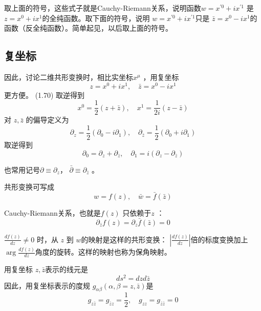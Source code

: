 取上面的符号，这些式子就是Cauchy-Riemann关系，说明函数$ w=x^{\prime 0}+i x^{\prime 1}$ 是 $z=x^{0}+i x^{1} $的全纯函数。取下面的符号，说明 $w=x^{\prime 0}+i x^{\prime 1} $只是 $\bar{z}=x^{0}-i x^{1} $的函数（反全纯函数）。简单起见，以后取上面的符号。

\subsection{复坐标}

因此，讨论二维共形变换时，相比实坐标$ x^\mu$ ，用复坐标
\begin{equation}
	z=x^{0}+i x^{1}, \quad \bar{z}=x^{0}-i x^{1}
\end{equation}
更方便。 (1.70) 取逆得到
\begin{equation}
	x^{0}=\frac{1}{2}(z+\bar{z}), \quad x^{1}=\frac{1}{2 i}(z-\bar{z})
\end{equation}
对 $z,\bar{z}$ 的偏导定义为
\begin{equation}
	\partial_{z}=\frac{1}{2}\left(\partial_{0}-i \partial_{1}\right), \quad \partial_{\bar{z}}=\frac{1}{2 }\left(\partial_{0}+i \partial_{1}\right)
\end{equation}
取逆得到
\begin{equation}
	\partial_{0}=\partial_{z}+\partial_{\bar{z}}, \quad \partial_{1}=i\left(\partial_{z}-\partial_{\bar{z}}\right)
\end{equation}

也常用记号$ \partial\equiv\partial_z $， $\bar{\partial}\equiv\partial_{\bar{z}}$ 。

共形变换可写成
\begin{equation}
	w=f(z), \quad \bar{w}=\bar{f}(\bar{z})
\end{equation}

Cauchy-Riemann关系，也就是$ f(z)$ 只依赖于$ z$ ：
\begin{equation}
	\partial_{\bar{z}} f(z)=\partial_{z} \bar{f}(\bar{z})=0
\end{equation}

$\frac{d f(z)}{d z} \neq 0$ 时，从 $z$ 到 $w $的映射是这样的共形变换： $\left|\frac{d f(z)}{d z}\right| $倍的标度变换加上 $\arg \frac{d f(z)}{d z} $角度的旋转。这样的映射也称为保角映射。

用复坐标 $z,\bar{z} $表示的线元是
$$
d s^{2}=d z d \bar{z}
$$
因此，用复坐标表示的度规 $g_{\alpha\beta}( \alpha,\beta=z,\bar{z})$是
\begin{equation}
g_{z \bar{z}}=g_{\bar{z} z}=\frac{1}{2}, \quad g_{z z}=g_{\bar{z} \bar{z}}=0
\end{equation}

